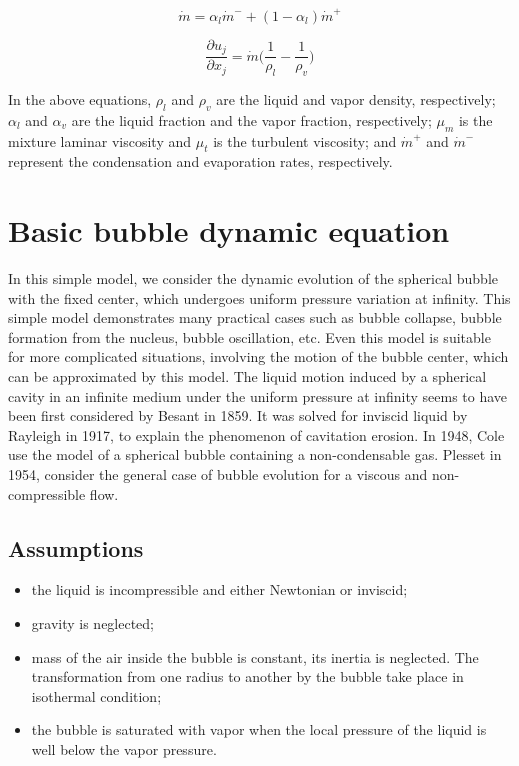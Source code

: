 \begin{equation}
\dot{m}={{\alpha}_l}\dot{m}^{-} + (1-{{\alpha}_l})\dot{m}^{+}
\end{equation}

\begin{equation}
\frac{\partial{{u_j}}}{\partial{x_j}}=\dot{m}\Bigg(\frac{1}{{\rho}_l}-\frac{1}{{\rho}_v}\Bigg)
\end{equation}

In the above equations, ${\rho}_l$ and ${\rho}_v$ are the liquid and
vapor density, respectively; ${\alpha}_l$ and ${\alpha}_v$ are the
liquid fraction and the vapor fraction, respectively; ${\mu}_m$ is the
mixture laminar viscosity and ${\mu}_t$ is the turbulent viscosity;
and $\dot{m}^+$ and $\dot{m}^-$ represent the condensation and
evaporation rates, respectively.

\section{Basic bubble dynamic equation}
In this simple model\cite{FundamentalsofCavitation.2004}, we consider
the dynamic evolution of the spherical bubble with the fixed center,
which undergoes uniform pressure variation at infinity. This simple
model demonstrates many practical cases such as bubble collapse,
bubble formation from the nucleus, bubble oscillation, etc. Even this
model is suitable for more complicated situations, involving the
motion of the bubble center, which can be approximated by this
model. The liquid motion induced by a spherical cavity in an infinite
medium under the uniform pressure at infinity seems to have been first
considered by Besant in 1859.  It was solved for inviscid liquid by
Rayleigh in 1917, to explain the phenomenon of cavitation erosion. In
1948, Cole use the model of a spherical bubble containing a
non-condensable gas. Plesset in 1954, consider the general case of
bubble evolution for a viscous and non-compressible flow.

\subsection{Assumptions}

\begin{itemize}
\item the liquid is incompressible and either Newtonian or inviscid;
\item gravity is neglected;
\item mass of the air inside the bubble is constant, its inertia is
  neglected. The transformation from one radius to another by the
  bubble take place in isothermal condition;
\item the bubble is saturated with vapor when the local pressure of
  the liquid is well below the vapor pressure.
\end{itemize}

